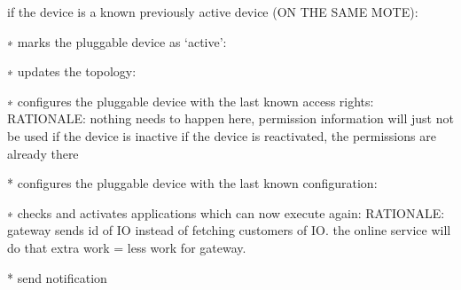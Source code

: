 

            if the device is a known previously active device (ON THE SAME MOTE):

                ∗ marks the pluggable device as ‘active’:

                ∗ updates the topology:

                ∗ configures the pluggable device with the last known access rights:
                    RATIONALE: nothing needs to happen here, permission information will just not be used if the device is inactive
                               if the device is reactivated, the permissions are already there

                * configures the pluggable device with the last known configuration:

                ∗ checks and activates applications which can now execute again:
                    RATIONALE: gateway sends id of IO instead of fetching customers of IO. the online service will do that extra work = less work for gateway.

                * send notification

